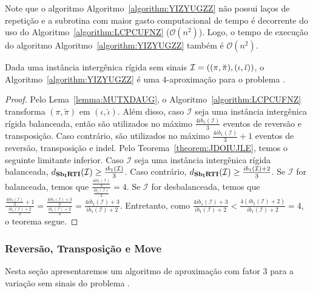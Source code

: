 Note que o algoritmo Algoritmo~\ref{algorithm:YIZYUGZZ} não possui laços de repetição e a subrotina com maior gasto computacional de tempo é decorrente do uso do Algoritmo~\ref{algorithm:LCPCUFNZ} ($\mathcal{O}(n^2)$). Logo, o tempo de execução do algoritmo Algoritmo~\ref{algorithm:YIZYUGZZ} também é $\mathcal{O}(n^2)$.

\begin{theorem}\label{theorem:ZEIGUWRR}
Dada uma instância intergênica rígida sem sinais $\mathcal{I}=((\pi,\breve\pi),\break(\iota,\breve\iota))$, o Algoritmo~\ref{algorithm:YIZYUGZZ} é uma $4$-aproximação para o problema \SbIRTI{}.
\end{theorem}
\begin{proof}
Pelo Lema~\ref{lemma:MUTXDAUG}, o Algoritmo~\ref{algorithm:LCPCUFNZ} transforma $(\pi,\breve\pi)$ em $(\iota,\breve\iota)$. Além disso, caso $\mathcal{I}$ seja uma instância intergênica rígida balanceada, então são utilizados no máximo $\frac{4ib_1(\mathcal{I})}{3}$ eventos de reversão e transposição. Caso contrário, são utilizados no máximo $\frac{4ib_1(\mathcal{I})}{3} + 1$ eventos de reversão, transposição e indel. Pelo Teorema~\ref{theorem:JDOIUJLE}, temos o seguinte limitante inferior. Caso $\mathcal{I}$ seja uma instância intergênica rígida balanceada, $d_{\textbf{Sb\textsubscript{I}RTI}}(\mathcal{I}) \ge \frac{ib_1(\mathcal{I})}{3}$. Caso contrário, $d_{\textbf{Sb\textsubscript{I}RTI}}(\mathcal{I}) \ge \frac{ib_1(\mathcal{I}) + 2}{3}$. Se $\mathcal{I}$ for balanceada, temos que $\frac{\frac{4ib_1(\mathcal{I})}{3}}{\frac{ib_1(\mathcal{I})}{3}}=4$. Se $\mathcal{I}$ for desbalanceada,  temos que $\frac{\frac{4ib_1(\mathcal{I})}{3} + 1}{\frac{ib_1(\mathcal{I}) + 2}{3}}=\frac{\frac{4ib_1(\mathcal{I})+3}{3}}{\frac{ib_1(\mathcal{I}) + 2}{3}}=\frac{4ib_1(\mathcal{I})+3}{ib_1(\mathcal{I})+2}$. Entretanto, como $\frac{4ib_1(\mathcal{I})+3}{ib_1(\mathcal{I})+2}<\frac{4(ib_1(\mathcal{I})+2)}{ib_1(\mathcal{I})+2}=4$, o teorema segue.
\end{proof}

\subsubsection{Reversão, Transposição e Move}

Nesta seção apresentaremos um algoritmo de aproximação com fator $3$ para a variação sem sinais do problema \SbIRTM{}. 

